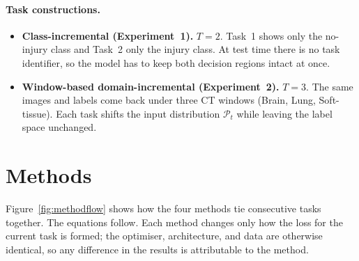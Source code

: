 \documentclass[11pt]{article}
\begin{document}
\paragraph{Task constructions.}
\begin{itemize}[leftmargin=1.4em,topsep=2pt,itemsep=2pt]
  \item \textbf{Class-incremental (Experiment~1).} $T{=}2$. Task~1 shows only the
        no-injury class and Task~2 only the injury class. At test time there is
        no task identifier, so the model has to keep both decision regions intact
        at once.
  \item \textbf{Window-based domain-incremental (Experiment~2).} $T{=}3$. The
        same images and labels come back under three CT windows (Brain, Lung,
        Soft-tissue). Each task shifts the input distribution $\mathcal{P}_t$
        while leaving the label space unchanged.
\end{itemize}

\section{Methods}\label{sec:methods}
Figure~\ref{fig:methodflow} shows how the four methods tie consecutive tasks
together. The equations follow. Each method changes only how the loss for the
current task is formed; the optimiser, architecture, and data are otherwise
identical, so any difference in the results is attributable to the method.
\end{document}
